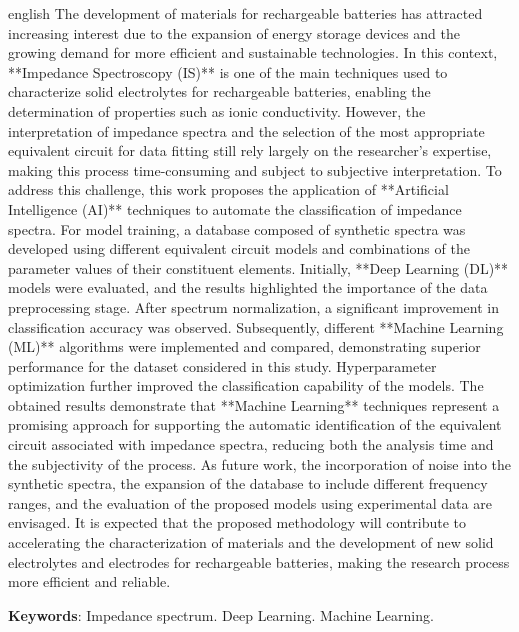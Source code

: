 \begin{resumo}[Abstract]
 \begin{otherlanguage*}{english}
The development of materials for rechargeable batteries has attracted increasing interest due to the expansion of energy storage devices and the growing demand for more efficient and sustainable technologies. In this context, **Impedance Spectroscopy (IS)** is one of the main techniques used to characterize solid electrolytes for rechargeable batteries, enabling the determination of properties such as ionic conductivity. However, the interpretation of impedance spectra and the selection of the most appropriate equivalent circuit for data fitting still rely largely on the researcher's expertise, making this process time-consuming and subject to subjective interpretation. To address this challenge, this work proposes the application of **Artificial Intelligence (AI)** techniques to automate the classification of impedance spectra.
For model training, a database composed of synthetic spectra was developed using different equivalent circuit models and combinations of the parameter values of their constituent elements. Initially, **Deep Learning (DL)** models were evaluated, and the results highlighted the importance of the data preprocessing stage. After spectrum normalization, a significant improvement in classification accuracy was observed. Subsequently, different **Machine Learning (ML)** algorithms were implemented and compared, demonstrating superior performance for the dataset considered in this study. Hyperparameter optimization further improved the classification capability of the models.
The obtained results demonstrate that **Machine Learning** techniques represent a promising approach for supporting the automatic identification of the equivalent circuit associated with impedance spectra, reducing both the analysis time and the subjectivity of the process. As future work, the incorporation of noise into the synthetic spectra, the expansion of the database to include different frequency ranges, and the evaluation of the proposed models using experimental data are envisaged. It is expected that the proposed methodology will contribute to accelerating the characterization of materials and the development of new solid electrolytes and electrodes for rechargeable batteries, making the research process more efficient and reliable.
 

   \vspace{\onelineskip}
 
   \noindent 
   \textbf{Keywords}: Impedance spectrum. Deep Learning. Machine Learning.
 \end{otherlanguage*}
\end{resumo}


